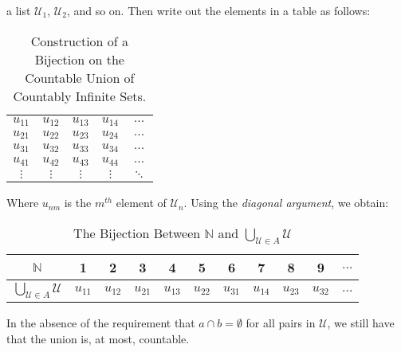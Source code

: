 \documentclass[crop=false,class=book,oneside]{standalone}
\begin{document}
            a list $\mathcal{U}_{1}$, $\mathcal{U}_{2}$, and
            so on. Then write out the elements in a table as
            follows:
            \begin{table}[H]
                \captionsetup{type=table}
                \centering
                \begin{tabular}{ccccc}
                    $u_{11}$&$u_{12}$&$u_{13}$
                    &$u_{14}$&$\hdots$\\
                    $u_{21}$&$u_{22}$&$u_{23}$
                    &$u_{24}$&$\hdots$\\
                    $u_{31}$&$u_{32}$&$u_{33}$
                    &$u_{34}$&$\hdots$\\
                    $u_{41}$&$u_{42}$&$u_{43}$
                    &$u_{44}$&$\hdots$\\
                    $\vdots$&$\vdots$&$\vdots$
                    &$\vdots$&$\ddots$
                \end{tabular}
                \caption{Construction of a Bijection on the
                         Countable Union of Countably Infinite
                         Sets.}
                \label{table:Func_Countable_Union_of_Countable}
            \end{table}
            Where $u_{nm}$ is the $m^{th}$ element of
            $\mathcal{U}_{n}$.
            Using the \textit{diagonal argument},
            we obtain:
            \begin{table}[H]
                \captionsetup{type=table}
                \centering
                \begin{tabular}{|c|c|c|c|c|c|c|c|c|c|c|}
                    \hline
                    $\mathbb{N}$&1&2&3&4&5&6&7&8&9&$\hdots$\\
                    \hline
                    $\bigcup_{\mathcal{U}\in{A}}\mathcal{U}$&
                    $u_{11}$&$u_{12}$&$u_{21}$&$u_{13}$&
                    $u_{22}$&$u_{31}$&$u_{14}$&$u_{23}$&
                    $u_{32}$&$\hdots$\\
                    \hline
                \end{tabular}
                \caption{The Bijection Between $\mathbb{N}$ and
                         $\bigcup_{\mathcal{U}\in{A}}\mathcal{U}$}
                \label{table:Func_Bijection_on_Countable_Union}
            \end{table}
            In the absence of the requirement that
            $a\cap{b}=\emptyset$ for all pairs in $\mathcal{U}$,
            we still have that the union is, at most, countable.
\end{document}
